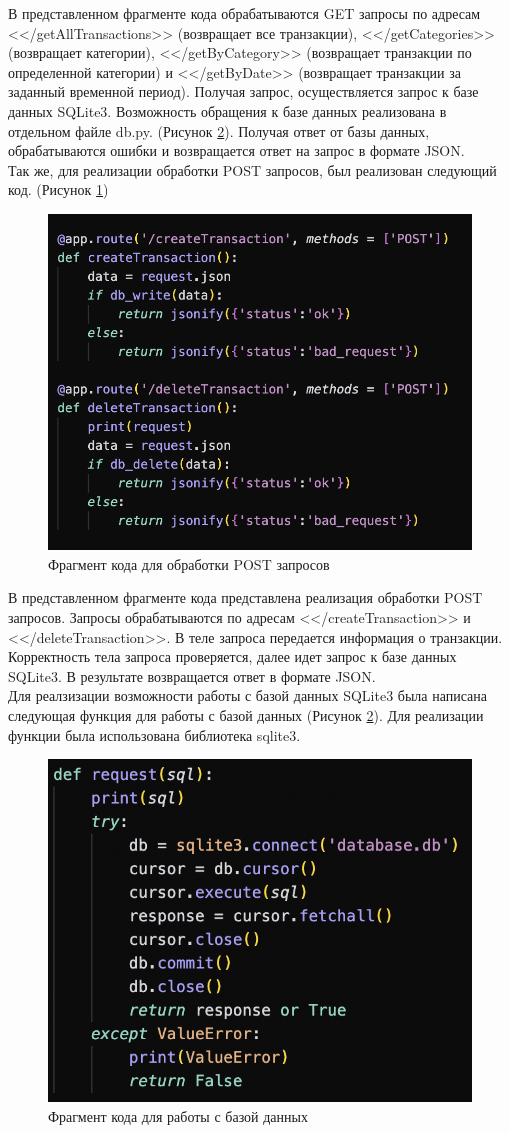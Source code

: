 \documentclass[14pt]{extreport}
\begin{document}
В представленном фрагменте кода обрабатываются GET запросы по адресам <</getAllTransactions>> (возвращает все транзакции), <</getCategories>> (возвращает категории), <</getByCategory>> (возвращает транзакции по определенной категории) и <</getByDate>> (возвращает транзакции за заданный временной период). Получая запрос, осуществляется запрос к базе данных SQLite3. Возможность обращения к базе данных реализована в отдельном файле db.py.  (Рисунок \ref{fig:d5}). Получая ответ от базы данных, обрабатываются ошибки и возвращается ответ на запрос в формате JSON.
\\

Так же, для реализации обработки POST запросов, был реализован следующий код. (Рисунок \ref{fig:d4})

\begin{figure}[h]   
    \centering
    \includegraphics[width=0.4\linewidth]{post.png}
    \caption{ Фрагмент кода для обработки POST запросов }
    \label{fig:d4}
\end{figure}

В представленном фрагменте кода представлена реализация обработки POST запросов. Запросы обрабатываются по адресам <</createTransaction>> и <</deleteTransaction>>. В теле запроса передается информация о транзакции. Корректность тела запроса проверяется, далее идет запрос к базе данных SQLite3. В результате возвращается ответ в формате JSON.
\\ 

Для реалзизации возможности работы с базой данных SQLite3 была написана следующая функция для работы с базой данных (Рисунок \ref{fig:d5}). Для реализации функции была использована библиотека sqlite3. 

\begin{figure}[h]   
    \centering
    \includegraphics[width=0.4\linewidth]{db2.png}
    \caption{ Фрагмент кода для работы с базой данных }
    \label{fig:d5}
\end{figure}
\end{document}
